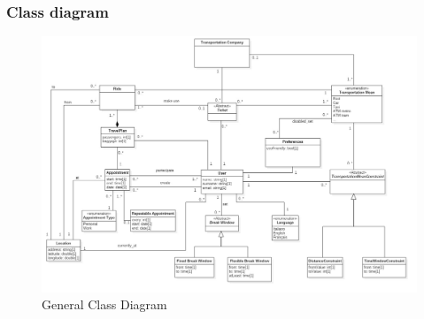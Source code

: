	\subsubsection{Class diagram}
		\begin{figure}[H]
			\centerline{\includegraphics[width=\paperwidth~]{Images/ClassDiagram}}
			\caption{General Class Diagram}
		\end{figure}
